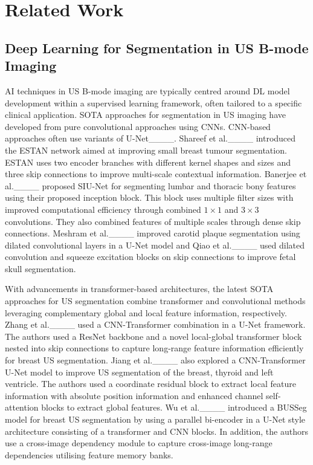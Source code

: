 \section{Related Work}
\subsection{Deep Learning for Segmentation in US B-mode Imaging}
AI techniques in US B-mode imaging are typically centred around DL model development within a supervised learning framework, often tailored to a specific clinical application. SOTA approaches for segmentation in US imaging have developed from pure convolutional approaches using CNNs. CNN-based approaches often use variants of U-Net____. Shareef et al.____ introduced the ESTAN network aimed at improving small breast tumour segmentation. ESTAN uses two encoder branches with different kernel shapes and sizes and three skip connections to improve multi-scale contextual information. Banerjee et al.____ proposed SIU-Net for segmenting lumbar and thoracic bony features using their proposed inception block. This block uses multiple filter sizes with improved computational efficiency through combined $1\times1$ and $3\times3$ convolutions. They also combined features of multiple scales through dense skip connections. Meshram et al.____ improved carotid plaque segmentation using dilated convolutional layers in a U-Net model and Qiao et al.____ used dilated convolution and squeeze excitation blocks on skip connections to improve fetal skull segmentation.

With advancements in transformer-based architectures, the latest SOTA approaches for US segmentation combine transformer and convolutional methods leveraging complementary global and local feature information, respectively. Zhang et al.____ used a CNN-Transformer combination in a U-Net framework. The authors used a ResNet backbone and a novel local-global transformer block nested into skip connections to capture long-range feature information efficiently for breast US segmentation. Jiang et al.____ also explored a CNN-Transformer U-Net model to improve US segmentation of the breast, thyroid and left ventricle. The authors used a coordinate residual block to extract local feature information with absolute position information and enhanced channel self-attention blocks to extract global features. Wu et al.____ introduced a BUSSeg model for breast US segmentation by using a parallel bi-encoder in a U-Net style architecture consisting of a transformer and CNN blocks. In addition, the authors use a cross-image dependency module to capture cross-image long-range dependencies utilising feature memory banks. 


